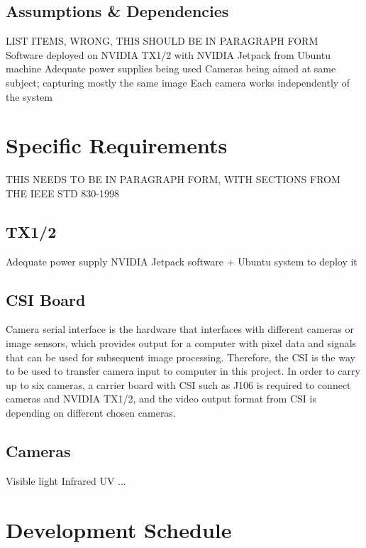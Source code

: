 \documentclass[letterpaper,10pt,serif,draftclsnofoot,onecolumn,compsoc,titlepage]{IEEEtran}
\begin{document}
\subsection{Assumptions \& Dependencies}

LIST ITEMS, WRONG, THIS SHOULD BE IN PARAGRAPH FORM\\
Software deployed on NVIDIA TX1/2 with NVIDIA Jetpack from Ubuntu machine
Adequate power supplies being used
Cameras being aimed at same subject; capturing mostly the same image
Each camera works independently of the system

\section{Specific Requirements}
THIS NEEDS TO BE IN PARAGRAPH FORM, WITH SECTIONS FROM THE IEEE STD 830-1998\\

\subsection{TX1/2}
		\subitem Adequate power supply
		\subitem NVIDIA Jetpack software + Ubuntu system to deploy it\\
\subsection{CSI Board}
		Camera serial interface is the hardware that interfaces with different cameras or image sensors, which provides output for a computer with pixel data and signals that can be used for subsequent image processing. Therefore, the CSI is the way to be used to transfer camera input to computer in this project.
		In order to carry up to six cameras, a carrier board with CSI such as J106 is required to connect cameras and NVIDIA TX1/2, and the video output format from CSI is depending on different chosen cameras.\\

\subsection{Cameras}
		\subitem Visible light
		\subitem Infrared
		\subitem UV
		\subitem ...\\

\newpage
	\section{Development Schedule}
\end{document}

